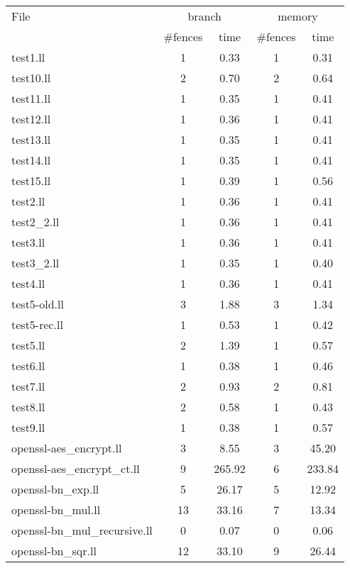 \begin{tabular}{l|c|c|c|c|}
\toprule
File & \multicolumn{2}{c|}{branch} & \multicolumn{2}{c|}{memory} \\
& \#fences & time & \#fences & time\\
\midrule
test1.ll & 1 & 0.33 & 1 & 0.31\\
test10.ll & 2 & 0.70 & 2 & 0.64\\
test11.ll & 1 & 0.35 & 1 & 0.41\\
test12.ll & 1 & 0.36 & 1 & 0.41\\
test13.ll & 1 & 0.35 & 1 & 0.41\\
test14.ll & 1 & 0.35 & 1 & 0.41\\
test15.ll & 1 & 0.39 & 1 & 0.56\\
test2.ll & 1 & 0.36 & 1 & 0.41\\
test2\_2.ll & 1 & 0.36 & 1 & 0.41\\
test3.ll & 1 & 0.36 & 1 & 0.41\\
test3\_2.ll & 1 & 0.35 & 1 & 0.40\\
test4.ll & 1 & 0.36 & 1 & 0.41\\
test5-old.ll & 3 & 1.88 & 3 & 1.34\\
test5-rec.ll & 1 & 0.53 & 1 & 0.42\\
test5.ll & 2 & 1.39 & 1 & 0.57\\
test6.ll & 1 & 0.38 & 1 & 0.46\\
test7.ll & 2 & 0.93 & 2 & 0.81\\
test8.ll & 2 & 0.58 & 1 & 0.43\\
test9.ll & 1 & 0.38 & 1 & 0.57\\
\midrule
openssl-aes\_encrypt.ll & 3 & 8.55 & 3 & 45.20\\
openssl-aes\_encrypt\_ct.ll & 9 & 265.92 & 6 & 233.84\\
openssl-bn\_exp.ll & 5 & 26.17 & 5 & 12.92\\
openssl-bn\_mul.ll & 13 & 33.16 & 7 & 13.34\\
openssl-bn\_mul\_recursive.ll & 0 & 0.07 & 0 & 0.06\\
openssl-bn\_sqr.ll & 12 & 33.10 & 9 & 26.44\\
\bottomrule
\end{tabular}
